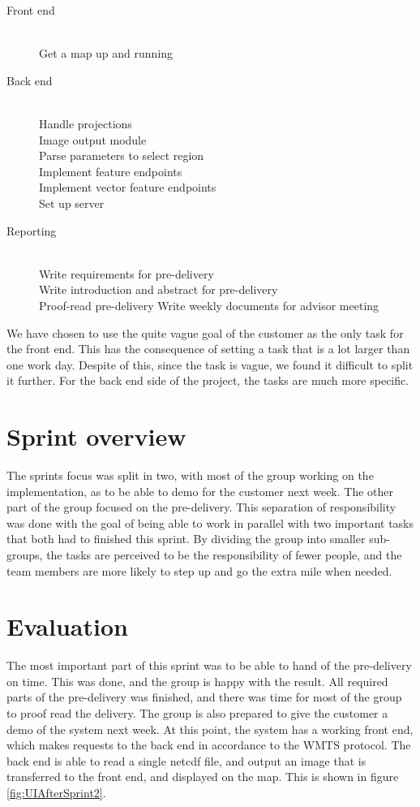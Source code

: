 \documentclass[11pt,a4paper,titlepage,oneside]{report}
\begin{document}
\begin{description}
	\item[Front end] \hfill \\
	Get a map up and running
	\item[Back end] \hfill \\
	Handle projections \hfill \\
	Image output module \hfill \\
	Parse parameters to select region \hfill \\
	Implement feature endpoints \hfill \\
	Implement vector feature endpoints \hfill \\
	Set up server
	\item[Reporting] \hfill \\ 
	Write requirements for \gls{pre-delivery} \hfill \\
	Write introduction and abstract for \gls{pre-delivery} \hfill \\
	Proof-read \gls{pre-delivery} 
	Write weekly documents for advisor meeting
\end{description}
	
We have chosen to use the quite vague goal of the customer as the only task for the front end. This has the consequence of setting a task that is a lot larger than one work day. Despite of this, since the task is vague, we found it difficult to split it further. For the back end side of the project, the tasks are much more specific.

\section{Sprint overview}
The sprints focus was split in two, with most of the group working on the implementation, as to be able to demo for the customer next week. The other part of the group focused on the \gls{pre-delivery}. This separation of responsibility was done with the goal of being able to work in parallel with two important tasks that both had to finished this sprint. By dividing the group into smaller sub-groups, the tasks are perceived to be the responsibility of fewer people, and the team members are more likely to step up and go the extra mile when needed. 

\section{Evaluation}
The most important part of this sprint was to be able to hand of the \gls{pre-delivery} on time. This was done, and the group is happy with the result. All required parts of the \gls{pre-delivery} was finished, and there was time for most of the group to proof read the delivery. The group is also prepared to give the customer a demo of the system next week. At this point, the system has a working front end, which makes requests to the back end in accordance to the \gls{WMTS} \gls{protocol}. The back end is able to read a single \gls{netcdf} file, and output an image that is transferred to the front end, and displayed on the map. This is shown in figure \ref{fig:UIAfterSprint2}.
\end{document}
